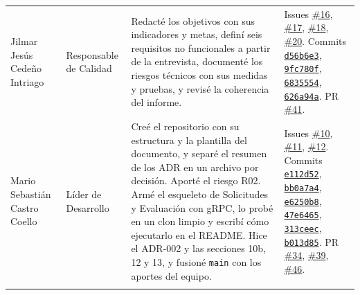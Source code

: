 \begin{xltabular}{\textwidth}{@{} >{\raggedright\arraybackslash}p{2.6cm} >{\raggedright\arraybackslash}p{2.4cm} >{\raggedright\arraybackslash}p{5.0cm} >{\raggedright\arraybackslash}p{4.0cm} @{}}
  Jilmar Jesús Cedeño Intriago & Responsable de Calidad &
  Redacté los objetivos con sus indicadores y metas, definí seis requisitos
  no funcionales a partir de la entrevista, documenté los riesgos técnicos
  con sus medidas y pruebas, y revisé la coherencia del informe. &
  Issues \href{https://github.com/reyshadow0/isr701-pfc/issues/16}{\#16}, \href{https://github.com/reyshadow0/isr701-pfc/issues/17}{\#17}, \href{https://github.com/reyshadow0/isr701-pfc/issues/18}{\#18}, \href{https://github.com/reyshadow0/isr701-pfc/issues/20}{\#20}.
  Commits \href{https://github.com/reyshadow0/isr701-pfc/commit/d56b6e3}{\texttt{d56b6e3}}, \href{https://github.com/reyshadow0/isr701-pfc/commit/9fc780f}{\texttt{9fc780f}}, \href{https://github.com/reyshadow0/isr701-pfc/commit/6835554}{\texttt{6835554}}, \href{https://github.com/reyshadow0/isr701-pfc/commit/626a94a}{\texttt{626a94a}}.
  PR \href{https://github.com/reyshadow0/isr701-pfc/pull/41}{\#41}. \\
  \addlinespace

  Mario Sebastián Castro Coello & Líder de Desarrollo &
  Creé el repositorio con su estructura y la plantilla del documento, y
  separé el resumen de los ADR en un archivo por decisión. Aporté el riesgo
  R02. Armé el esqueleto de Solicitudes y Evaluación con gRPC, lo probé en
  un clon limpio y escribí cómo ejecutarlo en el README. Hice el ADR-002 y
  las secciones 10b, 12 y 13, y fusioné \texttt{main} con los aportes del
  equipo. &
  Issues \href{https://github.com/reyshadow0/isr701-pfc/issues/10}{\#10}, \href{https://github.com/reyshadow0/isr701-pfc/issues/11}{\#11}, \href{https://github.com/reyshadow0/isr701-pfc/issues/12}{\#12}.
  Commits \href{https://github.com/reyshadow0/isr701-pfc/commit/e112d52}{\texttt{e112d52}}, \href{https://github.com/reyshadow0/isr701-pfc/commit/bb0a7a4}{\texttt{bb0a7a4}}, \href{https://github.com/reyshadow0/isr701-pfc/commit/e6250b8}{\texttt{e6250b8}}, \href{https://github.com/reyshadow0/isr701-pfc/commit/47e6465}{\texttt{47e6465}}, \href{https://github.com/reyshadow0/isr701-pfc/commit/313ceec}{\texttt{313ceec}}, \href{https://github.com/reyshadow0/isr701-pfc/commit/b013d85}{\texttt{b013d85}}.
  PR \href{https://github.com/reyshadow0/isr701-pfc/pull/34}{\#34}, \href{https://github.com/reyshadow0/isr701-pfc/pull/39}{\#39}, \href{https://github.com/reyshadow0/isr701-pfc/pull/46}{\#46}. \\
  \addlinespace


\end{xltabular}
